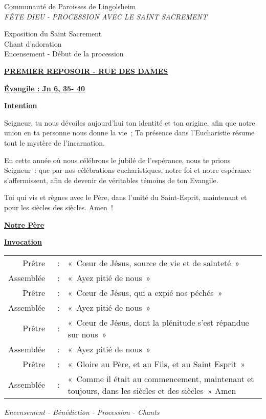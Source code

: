 \documentclass[french,11pt,a4paper]{article}
\newcommand{\JournalName}[1]{%
		\begin{center}
            \Large \usefont{T1}{augie}{m}{n}
			#1%
		\end{center}
		\par \normalsize \normalfont}
\newcommand{\NewsItem}[1]{%
\vspace{3pt}
\underline{\textbf{#1}}
		  }
\begin{document}
\begin{center}
\JournalName{Communauté de Paroisses de Lingolsheim \\
  \normalsize \textit{
FÊTE DIEU -
PROCESSION AVEC LE SAINT SACREMENT
}
}
\end{center}

Exposition du Saint Sacrement\\
Chant d'adoration\\
Encensement - Début de la procession

\NewsItem{PREMIER REPOSOIR - RUE DES DAMES}

\NewsItem{Évangile : Jn 6, 35- 40}

\NewsItem{Intention}

Seigneur, tu nous dévoiles aujourd’hui ton identité et ton origine, afin que notre union en ta personne nous donne la vie ; Ta présence dans l’Eucharistie résume tout le mystère de l’incarnation.

En cette année où nous célébrons le jubilé de l’espérance, nous te prions Seigneur : que par nos célébrations eucharistiques, notre foi et notre espérance s’affermissent, afin de devenir de véritables témoins de ton Evangile.

Toi qui vis et règnes avec le Père, dans l’unité du Saint-Esprit, maintenant et pour les siècles des siècles. Amen !

\NewsItem{Notre Père}

\NewsItem{Invocation}

\begin{tabular}{rcp{10cm}}
Prêtre & : &		« Cœur de Jésus, source de vie et de sainteté » \\
Assemblée & : &	« Ayez pitié de nous » \\
Prêtre & : &		« Cœur de Jésus, qui a expié nos péchés » \\
Assemblée & : &	« Ayez pitié de nous » \\
Prêtre & : &		« Cœur de Jésus, dont la plénitude s’est répandue sur nous » \\
Assemblée & : &	« Ayez pitié de nous » \\
Prêtre & : &		« Gloire au Père, et au Fils, et au Saint Esprit » \\
Assemblée & : &	« Comme il était au commencement, maintenant et toujours, dans les siècles et des siècles » Amen  \\
\end{tabular}
\emph{Encensement - Bénédiction - Procession - Chants}
\end{document}
